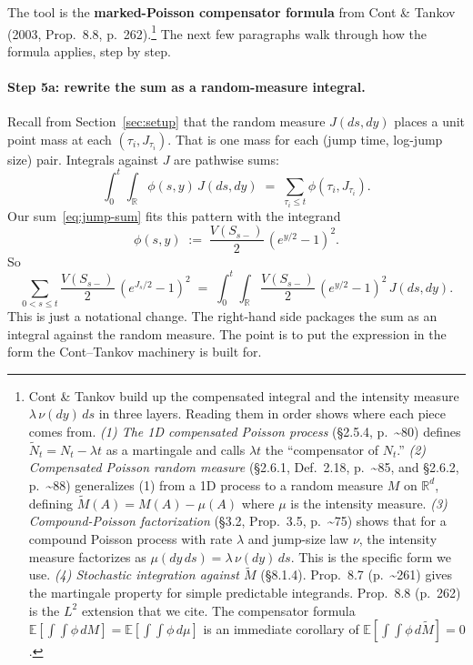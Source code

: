 \documentclass[11pt]{article}
\theoremstyle{definition}
\theoremstyle{remark}
\newcommand{\E}{\mathbb{E}}
\newcommand{\R}{\mathbb{R}}
\newcommand{\1}{\mathbf{1}}
\begin{document}
The tool is the \textbf{marked-Poisson compensator formula} from Cont \& Tankov (2003, Prop.~8.8, p.~262).\footnote{Cont \& Tankov build up the compensated integral and the intensity measure $\lambda\,\nu(dy)\,ds$ in three layers. Reading them in order shows where each piece comes from. \emph{(1) The 1D compensated Poisson process} (\S2.5.4, p.~\textasciitilde80) defines $\tilde N_t = N_t - \lambda t$ as a martingale and calls $\lambda t$ the ``compensator of $N_t$.'' \emph{(2) Compensated Poisson random measure} (\S2.6.1, Def.~2.18, p.~\textasciitilde85, and \S2.6.2, p.~\textasciitilde88) generalizes (1) from a 1D process to a random measure $M$ on $\R^d$, defining $\tilde M(A) = M(A) - \mu(A)$ where $\mu$ is the intensity measure. \emph{(3) Compound-Poisson factorization} (\S3.2, Prop.~3.5, p.~\textasciitilde75) shows that for a compound Poisson process with rate $\lambda$ and jump-size law $\nu$, the intensity measure factorizes as $\mu(dy\,ds) = \lambda\,\nu(dy)\,ds$. This is the specific form we use. \emph{(4) Stochastic integration against $\tilde M$} (\S8.1.4). Prop.~8.7 (p.~\textasciitilde261) gives the martingale property for simple predictable integrands. Prop.~8.8 (p.~262) is the $L^2$ extension that we cite. The compensator formula $\E[\int\!\int\phi\,dM] = \E[\int\!\int\phi\,d\mu]$ is an immediate corollary of $\E[\int\!\int\phi\,d\tilde M] = 0$.} The next few paragraphs walk through how the formula applies, step by step.

\paragraph{Step 5a: rewrite the sum as a random-measure integral.}
Recall from Section~\ref{sec:setup} that the random measure $J(ds, dy)$ places a unit point mass at each $(\tau_i, J_{\tau_i})$. That is one mass for each (jump time, log-jump size) pair. Integrals against $J$ are pathwise sums:
\[
\int_0^t \!\int_\R \phi(s, y)\,J(ds, dy) \;=\; \sum_{\tau_i \le t} \phi(\tau_i, J_{\tau_i}).
\]
Our sum~\eqref{eq:jump-sum} fits this pattern with the integrand
\[
\phi(s, y) \;:=\; \frac{V(S_{s-})}{2}\,(e^{y/2} - 1)^2.
\]
So
\begin{equation}\label{eq:sum-as-integral}
\sum_{0 < s \le t} \frac{V(S_{s-})}{2}\,(e^{J_s/2} - 1)^2 \;=\; \int_0^t\!\int_\R \frac{V(S_{s-})}{2}\,(e^{y/2} - 1)^2\,J(ds, dy).
\end{equation}
This is just a notational change. The right-hand side packages the sum as an integral against the random measure. The point is to put the expression in the form the Cont--Tankov machinery is built for.
\end{document}
